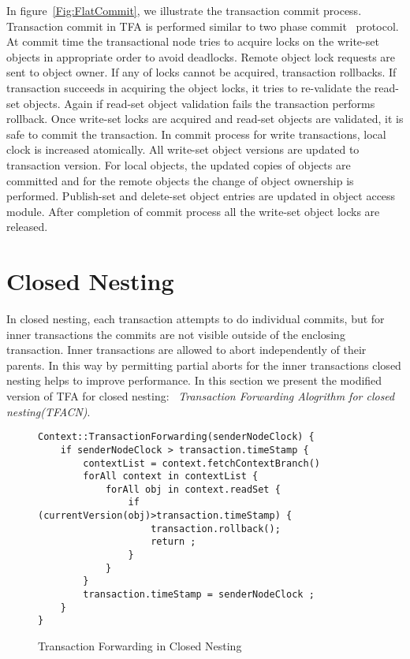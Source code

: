 \documentclass[12pt,english]{report}
\begin{document}
In figure~\ref{Fig:FlatCommit}, we illustrate the transaction commit process. Transaction commit in TFA is performed similar to two phase commit~\cite{TwoPC:weikum1991principles} protocol. At commit time the transactional node tries to acquire locks on the write-set objects in appropriate order to avoid deadlocks. Remote object lock requests are sent to object owner. If any of locks cannot be acquired, transaction rollbacks. If transaction succeeds in acquiring the object locks, it tries to re-validate the read-set objects. Again if read-set object validation fails the transaction performs rollback. Once write-set locks are acquired and read-set objects are validated, it is safe to commit the transaction. In commit process for write transactions, local clock is increased atomically. All write-set object versions are updated to transaction version. For local objects, the updated copies of objects are committed and for the remote objects the change of object ownership is performed. Publish-set and delete-set object entries are updated in object access module. After completion of commit process all the write-set object locks are released. 
   
\section{Closed Nesting} 

In closed nesting, each transaction attempts to do individual commits, but for inner transactions the commits are not visible outside of the enclosing transaction. Inner transactions are allowed to abort independently of their parents. In this way by permitting partial aborts for the inner transactions closed nesting helps to improve performance. In this section we present the modified version of TFA for closed nesting: ~\emph{Transaction Forwarding Alogrithm for closed nesting(TFACN)}.

\begin{figure}[H]
\begin{minipage}[b]{0.9\linewidth}\centering
\begin{lstlisting}
Context::TransactionForwarding(senderNodeClock) {
	if senderNodeClock > transaction.timeStamp {
		contextList = context.fetchContextBranch()
		forAll context in contextList {
			forAll obj in context.readSet {
				if (currentVersion(obj)>transaction.timeStamp) { 
					transaction.rollback();
					return ;
				}		
			}
		}
		transaction.timeStamp = senderNodeClock ; 
	}
}
\end{lstlisting}
\end{minipage}
\caption{Transaction Forwarding in Closed Nesting}
\label{Fig:CloseTFA}
\end{figure} 
\end{document}
